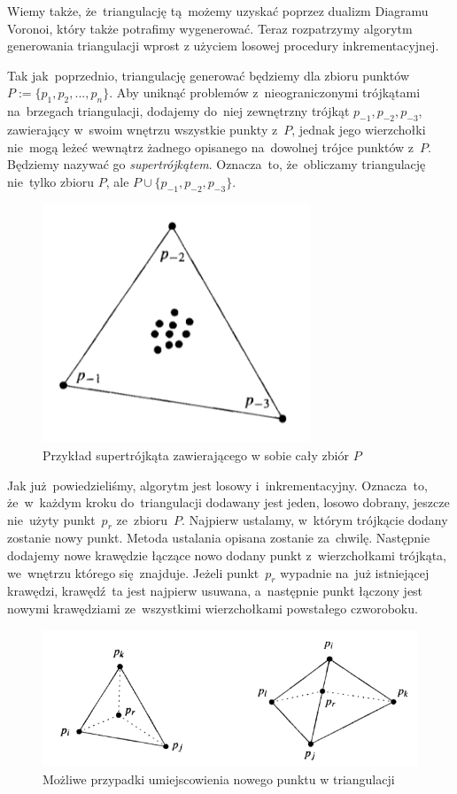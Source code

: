 \documentclass[skorowidz,autorrok,backref,xodstep,oswiadczenie]{wmimgr}
\begin{document}
Wiemy także, że~triangulację tą~możemy uzyskać poprzez dualizm Diagramu Voronoi, który także potrafimy wygenerować. Teraz rozpatrzymy algorytm generowania triangulacji wprost z użyciem losowej procedury inkrementacyjnej.

Tak jak~poprzednio, triangulację generować będziemy dla zbioru punktów~$P:=\{ p_{1},p_{2},...,p_{n} \}$. Aby uniknąć problemów z~nieograniczonymi trójkątami na~brzegach triangulacji, dodajemy do~niej zewnętrzny trójkąt $p_{-1}, p_{-2}, p_{-3}$, zawierający w~swoim wnętrzu wszystkie punkty z~$P$, jednak jego wierzchołki nie~mogą leżeć wewnątrz żadnego opisanego na~dowolnej trójce punktów z~$P$. Będziemy nazywać go \emph{supertrójkątem}. Oznacza~to, że~obliczamy triangulację nie~tylko zbioru $P$, ale $P \cup \{p_{-1}, p_{-2}, p_{-3}\}$.


\begin{figure}[ht!]
\centering
\includegraphics[width=80mm]{images/triangulacja5.png}
\caption{Przykład supertrójkąta zawierającego w sobie cały zbiór $P$}
\label{supertriangle}
\end{figure}

Jak już~powiedzieliśmy, algorytm jest losowy i~inkrementacyjny. Oznacza~to, że~w~każdym kroku do~triangulacji dodawany jest jeden, losowo dobrany, jeszcze nie~użyty punkt~$p_{r}$ ze~zbioru~$P$. Najpierw ustalamy, w~którym trójkącie dodany zostanie nowy punkt. Metoda ustalania opisana zostanie za~chwilę. Następnie dodajemy nowe krawędzie łączące nowo dodany punkt z~wierzchołkami trójkąta, we~wnętrzu którego się~znajduje. Jeżeli punkt~$p_{r}$ wypadnie na~już istniejącej krawędzi, krawędź~ta jest najpierw usuwana, a~następnie punkt łączony jest nowymi krawędziami ze~wszystkimi wierzchołkami powstałego czworoboku.

\begin{figure}[ht!]
\centering
\includegraphics[width=130mm]{images/triangulacja6.png}
\caption{Możliwe przypadki umiejscowienia nowego punktu w triangulacji}
\label{newpointposition}
\end{figure}
\end{document}
